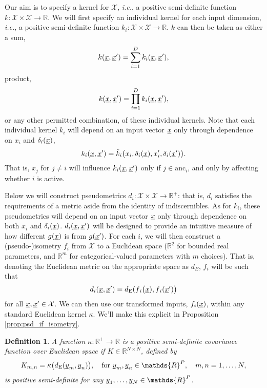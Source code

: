 \documentclass{article}
\newcommand{\vect}[1]{\underline{\smash{#1}}}
\renewcommand{\v}[1]{\vect{#1}}
\newcommand{\reals}{\mathds{R}}
\newcommand{\sX}{\mathcal{X}}
\newtheorem{define}[thm]{Definition}
\begin{document}
Our aim is to specify a kernel for $\sX$, \emph{i.e.}, a positive semi-definite function  $k\colon \sX \times \sX \to \reals$. We will first specify an individual kernel for each input dimension, \emph{i.e.}, a positive semi-definite function $k_i\colon \sX \times \sX \to \reals$. $k$ can then be taken as either a sum,
\begin{equation}
 k(\v{x}, \v{x}') = \sum_{i=1}^D k_i(\v{x},\v{x}'),
\end{equation}
product,
\begin{equation}
 k(\v{x}, \v{x}') = \prod_{i=1}^D k_i(\v{x},\v{x}'),
\end{equation}
or any other permitted combination, of these individual kernels. Note that each individual kernel $k_i$ will depend on an input vector $\v{x}$ only through dependence on $x_i$ and $\delta_i(\v{x})$,
\begin{equation}
  k_i(\v{x},\v{x}') = \tilde{k}_i\bigl(x_i,\delta_i(\v{x}),x_i', \delta_i(\v{x}') \bigr).
\end{equation}
That is, $x_j$ for $j\neq i$ will influence $k_i(\v{x},\v{x}')$ only if $j \in \text{anc}_i$, and only by affecting whether $i$ is active.

Below we will construct pseudometrics $d{_i}\colon \sX \times \sX \to \reals^+$: that is, $d_i$ satisfies the requirements of a metric aside from the identity of indiscernibles. As for $k_i$, these pseudometrics will depend on an input vector $\v{x}$ only through dependence on both $x_i$ and $\delta_i(\v{x})$. $d{_i}(\v{x}, \v{x}')$ will be designed to provide an intuitive measure of how different $g(\v{x})$ is from $g(\v{x}')$. 
For each $i$, we will then construct a (pseudo-)isometry $f_i$ from
$\sX$ 
to a Euclidean space ($\reals^2$ for bounded real parameters, and $\reals^m$ for categorical-valued parameters with $m$ choices). That is, denoting the Euclidean metric on the appropriate space as $d{_E}$, $f_i$ will be such that
\begin{equation}
\label{eqn:d_i}
 d{_i}(\v{x},\v{x}')
=
d_{\text{E}}(f{_i}\bigl(\v{x}), f{_i}(\v{x}')\bigr)
\end{equation}
for all $\v{x}, \v{x}' \in \sX$. We can then use our transformed inputs, $f_i(\v{x})$, within any standard Euclidean kernel $\kappa$. We'll make this explicit in Proposition \ref{prop:psd_if_isometry}. 

\begin{define}
\label{def:psd_fun_euclid}
A function $\kappa\colon \reals^+ \to \reals$ is \emph{a positive semi-definite covariance function over Euclidean space} if $K \in \reals^{N\times N}$, defined by 
\begin{equation}
\nonumber K_{m, n} = \kappa\bigl(d_{\text{E}}(\v{y}_m, \v{y}_n)\bigr),\quad \text{for }
\v{y}_m, \v{y}_n \in \reals^P,\quad m, n = 1, \ldots, N, 
\end{equation}
is positive semi-definite for any $\v{y}_1, \dots, \v{y}_N \in \reals^P$. 
\end{define}
\end{document}
